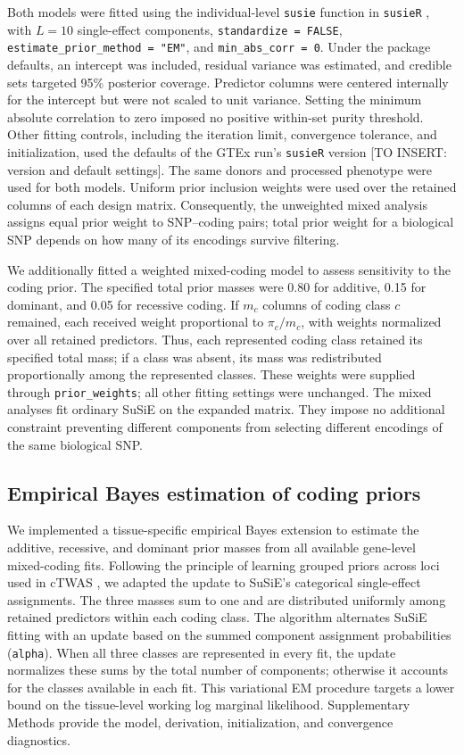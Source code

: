\documentclass[12pt]{article}
\begin{document}
Both models were fitted using the individual-level \texttt{susie} function
in \texttt{susieR} \cite{wang_simple_2020}, with $L=10$ single-effect
components, \texttt{standardize = FALSE},
\texttt{estimate\_prior\_method = "EM"}, and
\texttt{min\_abs\_corr = 0}. Under the package defaults, an intercept was
included, residual variance was estimated, and credible sets targeted
95\% posterior coverage. Predictor columns were centered internally for
the intercept but were not scaled to unit variance. Setting the minimum
absolute correlation to zero imposed no positive within-set purity
threshold. Other fitting controls, including the iteration limit,
convergence tolerance, and initialization, used the defaults of the GTEx
run's \texttt{susieR} version [TO INSERT: version and default settings].
The same donors and processed phenotype were used for both models.
Uniform prior inclusion weights were used over the retained columns of
each design matrix. Consequently, the unweighted mixed analysis assigns
equal prior weight to SNP--coding pairs; total prior weight for a
biological SNP depends on how many of its encodings survive filtering.

We additionally fitted a weighted mixed-coding model to assess sensitivity
to the coding prior. The specified total prior masses were 0.80 for
additive, 0.15 for dominant, and 0.05 for recessive coding. If $m_c$ columns
of coding class $c$ remained, each received weight proportional to
$\pi_c/m_c$, with weights normalized over all retained predictors.
Thus, each represented coding class retained its specified total mass;
if a class was absent, its mass was redistributed proportionally among
the represented classes. These weights were supplied through
\texttt{prior\_weights}; all other fitting settings were unchanged.
The mixed analyses fit ordinary SuSiE on the expanded matrix. They impose
no additional constraint preventing different components from selecting
different encodings of the same biological SNP.

\subsection{Empirical Bayes estimation of coding priors}
We implemented a tissue-specific empirical Bayes extension to estimate
the additive, recessive, and dominant prior masses from all available
gene-level mixed-coding fits. Following the principle of learning grouped
priors across loci used in cTWAS \cite{zhao_adjusting_2024}, we adapted the
update to SuSiE's categorical single-effect assignments. The three masses
sum to one and are distributed uniformly among retained predictors within
each coding class. The algorithm alternates SuSiE fitting with an update
based on the summed component assignment probabilities (\texttt{alpha}).
When all three classes are represented in every fit, the update normalizes
these sums by the total number of components; otherwise it accounts for
the classes available in each fit. This variational EM procedure targets
a lower bound on the tissue-level working log marginal likelihood.
Supplementary Methods provide the model, derivation, initialization, and
convergence diagnostics.
\end{document}

